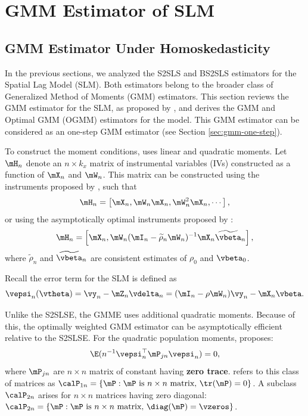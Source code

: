 \documentclass[english,12pt]{book}\usepackage[]{graphicx}\usepackage[]{xcolor}
\begin{document}
\section{GMM Estimator of SLM}\label{sec:gmm-slm}

\subsection{GMM Estimator Under Homoskedasticity}\label{sec:gmm-slm-homo}

In the previous sections, we analyzed the S2SLS and BS2SLS estimators for the Spatial Lag Model (SLM). Both estimators belong to the broader class of Generalized Method of Moments (GMM) estimators. This section reviews the GMM estimator for the SLM, as proposed by \cite{lee2007gmm}, and derives the GMM and Optimal GMM (OGMM) estimators for the model. This GMM estimator can be considered as an one-step GMM estimator (see Section \ref{sec:gmm-one-step}).

To construct the moment conditions, \cite{lee2007gmm} uses linear and quadratic moments. Let $\mH_n$ denote an $n \times k_x$ matrix of instrumental variables (IVs) constructed as a function of $\mX_n$ and $\mW_n$. This matrix can be constructed using the instruments proposed by \cite{kelejian1998generalized}, such that
\begin{equation*}
\mH_n = \left[\mX_n, \mW_n\mX_n, \mW_n^2\mX_n, \cdots\right],
\end{equation*}
%
or using the asymptotically optimal instruments proposed by \cite{lee2003best}:
\begin{equation*}
\mH_n = \left[\mX_n,  \mW_n(\mI_n - \widetilde{\rho}_n\mW_n)^{-1}\mX_n\widetilde{\vbeta}_n\right],
\end{equation*}
%
where $\widetilde{\rho}_n$ and $\widetilde{\vbeta}_n$ are consistent estimates of $\rho_0$ and $\vbeta_0$.

Recall the error term for the SLM is defined as
\begin{equation*}
\vepsi_n(\vtheta) = \vy_n - \mZ_n\vdelta_n = (\mI_n - \rho \mW_n)\vy_n - \mX_n\vbeta.
\end{equation*}

Unlike the S2SLSE, the GMME uses additional quadratic moments. Because of this, the optimally weighted GMM estimator can be asymptotically efficient relative to the S2SLSE. For the quadratic population moments, \cite{lee2007gmm} proposes:
\begin{equation}\label{eq:quadractic-moment-lee}
\E(n^{-1}\vepsi_n^\top \mP_{jn}\vepsi_n) = 0, 
\end{equation}
%
where $\mP_{jn}$ are $n\times n$ matrix of constant having \textbf{zero trace}. \cite{lee2007gmm} refers to this class of matrices as $\calP_{1n} = \{\mP: \text{$\mP$ is $n\times n$ matrix, $\tr(\mP) = 0$}\}$. A subclass $\calP_{2n}$ arises for $n\times n$ matrices having zero diagonal: $\calP_{2n} = \{\mP: \text{$\mP$ is $n\times n$ matrix, $\diag(\mP) = \vzeros$}\}$. 
\end{document}
